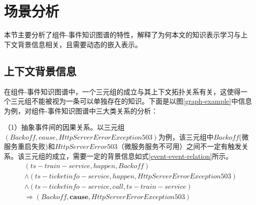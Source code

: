 \section{场景分析}\label{backgroud-analysis}
本节主要分析了组件-事件知识图谱的特性，解释了为何本文的知识表示学习与上下文背景信息相关，且需要动态的嵌入表示。

\subsection{上下文背景信息}\label{context-analysis}
在组件-事件知识图谱中，一个三元组的成立与其上下文拓扑关系有关，这使得一个三元组不能被视为一条可以单独存在的知识。下面是以图\ref{graph-example}中信息为例，对组件-事件知识图谱中三大类关系的分析：

（1）抽象事件间的因果关系。以三元组$\left(Backoff, cause, HttpServerError Exception 503\right)$为例，该三元组中$Backoff$(微服务重启失败)和$HttpServerError 503$（微服务服务不可用）之间不一定有触发关系。该三元组的成立，需要一定的背景信息如式\ref{event-event-relation}所示。
\begin{equation}
    \begin{aligned}
        &\left ( ts-train-service, happen, Backoff \right ) \\
        &\wedge \left ( ts-ticketinfo-service, happen, HttpServerError Exception 503 \right ) \\
        &\wedge \left ( ts-ticketinfo-service, call, ts-train-service \right ) \\
        &\Rightarrow \left ( Backoff, \boldsymbol{cause}, HttpServerError Exception 503 \right )
    \end{aligned}
\label{event-event-relation}
\end{equation}


